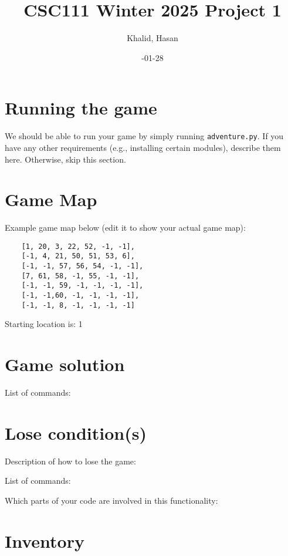 \documentclass[11pt]{article}
\title{CSC111 Winter 2025 Project 1}
\author{Khalid, Hasan}
\date{\2025-01-28}
\begin{document}
\maketitle

\section*{Running the game}
We should be able to run your game by simply running \texttt{adventure.py}. If you have any other requirements (e.g., installing certain modules), describe them here. Otherwise, skip this section.

\section*{Game Map}
Example game map below (edit it to show your actual game map):

\begin{verbatim}
    [1, 20, 3, 22, 52, -1, -1],
    [-1, 4, 21, 50, 51, 53, 6],
    [-1, -1, 57, 56, 54, -1, -1],
    [7, 61, 58, -1, 55, -1, -1],
    [-1, -1, 59, -1, -1, -1, -1],
    [-1, -1,60, -1, -1, -1, -1],
    [-1, -1, 8, -1, -1, -1, -1]

\end{verbatim}

Starting location is: 1

\section*{Game solution}
List of commands:

\section*{Lose condition(s)}
Description of how to lose the game:

List of commands:

Which parts of your code are involved in this functionality:


\section*{Inventory}
\end{document}

